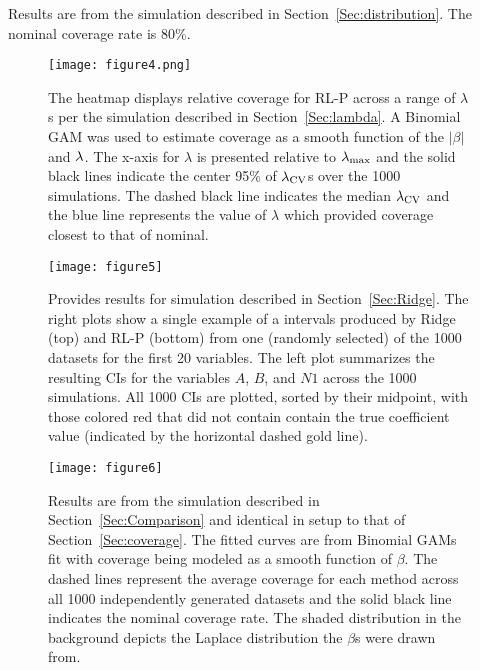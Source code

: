 \begin{table}[htb!]
  \centering
  
  \caption{\label{Tab:dist_beta} Results are from the simulation described in Section~\ref{Sec:distribution}. The nominal coverage rate is 80\%.}
\end{table}


\begin{figure}[htb!]
  \begin{center}
  \texttt{[image: figure4.png]}
  \caption{\label{Fig:beta_lambda_heatmap_laplace} The heatmap displays relative coverage for RL-P across a range of $\lambda$s per the simulation described in Section~\ref{Sec:lambda}. A Binomial GAM was used to estimate coverage as a smooth function of the $|\beta|$ and $\lambda$. The x-axis for $\lambda$ is presented relative to $\lambda_{\max}$ and the solid black lines indicate the center 95\% of $\lambda_{\textrm{CV}}$s over the 1000 simulations. The dashed black line indicates the median $\lambda_{\textrm{CV}}$ and the blue line represents the value of $\lambda$ which provided coverage closest to that of nominal.}
  \end{center}
\end{figure}

\begin{figure}[htb!]
  \begin{center}
  \texttt{[image: figure5]}
  \caption{\label{Fig:highcorr} Provides results for simulation described in Section~\ref{Sec:Ridge}. The right plots show a single example of a intervals produced by Ridge (top) and RL-P (bottom) from one (randomly selected) of the 1000 datasets for the first 20 variables. The left plot summarizes the resulting CIs for the variables $A$, $B$, and $N1$ across the 1000 simulations. All 1000 CIs are plotted, sorted by their midpoint, with those colored red that did not contain contain the true coefficient value (indicated by the horizontal dashed gold line).}
  \end{center}
\end{figure}

\begin{figure}[htb!]
  \begin{center}
    \texttt{[image: figure6]}
    \caption{\label{Fig:laplace_comparison} Results are from the simulation described in Section~\ref{Sec:Comparison} and identical in setup to that of Section~\ref{Sec:coverage}. The fitted curves are from Binomial GAMs fit with coverage being modeled as a smooth function of $\beta$. The dashed lines represent the average coverage for each method across all 1000 independently generated datasets and the solid black line indicates the nominal coverage rate. The shaded distribution in the background depicts the Laplace distribution the $\beta$s were drawn from.}
  \end{center}
\end{figure}

